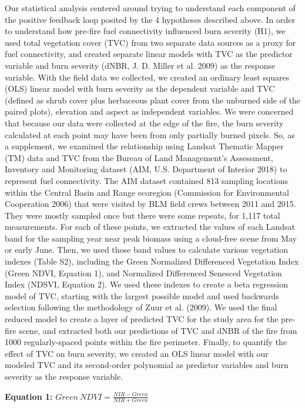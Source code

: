 \documentclass[
  12pt,
]{article}
\begin{document}
Our statistical analysis centered around trying to understand each
component of the positive feedback loop posited by the 4 hypotheses
described above. In order to understand how pre-fire fuel connectivity
influenced burn severity (H1), we used total vegetation cover (TVC) from
two separate data sources as a proxy for fuel connectivity, and created
separate linear models with TVC as the predictor variable and burn
severity (dNBR, J. D. Miller et al. 2009) as the response variable. With
the field data we collected, we created an ordinary least squares (OLS)
linear model with burn severity as the dependent variable and TVC
(defined as shrub cover plus herbaceous plant cover from the unburned
side of the paired plots), elevation and aspect as independent
variables. We were concerned that because our data were collected at the
edge of the fire, the burn severity calculated at each point may have
been from only partially burned pixels. So, as a supplement, we examined
the relationship using Landsat Thematic Mapper (TM) data and TVC from
the Bureau of Land Management's Assessment, Inventory and Monitoring
dataset (AIM, U.S. Department of Interior 2018) to represent fuel
connectivity. The AIM dataset contained 813 sampling locations within
the Central Basin and Range ecoregion (Commission for Environmental
Cooperation 2006) that were visited by BLM field crews between 2011 and
2015. They were mostly sampled once but there were some repeats, for
1,117 total measurements. For each of these points, we extracted the
values of each Landsat band for the sampling year near peak biomass
using a cloud-free scene from May or early June. Then, we used those
band values to calculate various vegetation indexes (Table S2),
including the Green Normalized Differenced Vegetation Index (Green NDVI,
Equation 1), and Normalized Differenced Senesced Vegetation Index
(NDSVI, Equation 2). We used these indexes to create a beta regression
model of TVC, starting with the largest possible model and used
backwards selection following the methodology of Zuur et al. (2009). We
used the final reduced model to create a layer of predicted TVC for the
study area for the pre-fire scene, and extracted both our predictions of
TVC and dNBR of the fire from 1000 regularly-spaced points within the
fire perimeter. Finally, to quantify the effect of TVC on burn severity,
we created an OLS linear model with our modeled TVC and its second-order
polynomial as predictor variables and burn severity as the response
variable.

\textbf{Equation 1:} \(Green~NDVI = \frac{NIR - Green}{NIR + Green}\)
\end{document}

